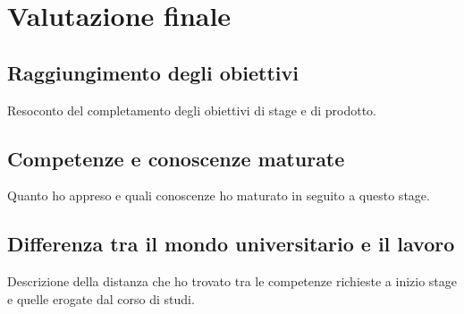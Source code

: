 
\chapter{Valutazione finale}
\label{cap:valutazione-finale}

\section{Raggiungimento degli obiettivi}
Resoconto del completamento degli obiettivi di stage e di prodotto.



\section{Competenze e conoscenze maturate}
Quanto ho appreso e quali conoscenze ho maturato in seguito a questo stage.

\section{Differenza tra il mondo universitario e il lavoro}
Descrizione della distanza che ho trovato tra le competenze richieste a inizio stage e quelle erogate dal corso di studi.
